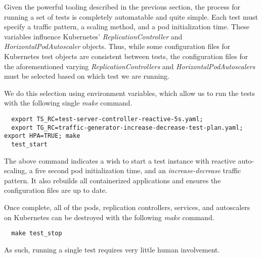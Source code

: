 Given the powerful tooling described in the previous section, the process for
running a set of tests is completely automatable and quite simple. Each test
must specify a traffic pattern, a scaling method, and a pod initialization time.
These variables influence Kubernetes' \textit{ReplicationController} and
\textit{HorizontalPodAutoscaler} objects. Thus, while some configuration files
for Kubernetes test objects are consistent between tests, the configuration
files for the aforementioned varying \textit{ReplicationControllers} and
\textit{HorizontalPodAutoscalers} must be selected based on which test we are
running.

We do this selection using environment variables, which allow us to run the
tests with the following single \textit{make} command.

\begin{verbatim}
  export TS_RC=test-server-controller-reactive-5s.yaml;
  export TG_RC=traffic-generator-increase-decrease-test-plan.yaml; export HPA=TRUE; make
  test_start
\end{verbatim}

The above command indicates a wish to start a test instance with reactive
auto-scaling, a five second pod initialization time, and an
\textit{increase-decrease} traffic pattern. It also rebuilds all containerized
applications and ensures the configuration files are up to date.

Once complete, all of the pods, replication controllers, services, and
autoscalers on Kubernetes can be destroyed with the following \textit{make}
command.

\begin{verbatim}
  make test_stop
\end{verbatim}

As such, running a single test requires very little human involvement.
